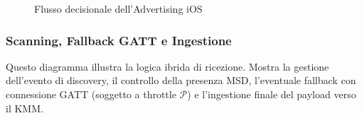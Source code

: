 \documentclass[a4paper,11pt,table,dvipsnames]{article}
\begin{document}
\begin{figure}[H]
    \caption{Flusso decisionale dell'Advertising iOS}
    \label{fig:ios_advertising_flow}
\end{figure}

\newpage

\subsubsection{Scanning, Fallback GATT e Ingestione}
Questo diagramma illustra la logica ibrida di ricezione. Mostra la gestione dell'evento di discovery, il controllo della presenza MSD, l'eventuale fallback con connessione GATT (soggetto a throttle \(\mathcal{P}\)) e l'ingestione finale del payload verso il KMM.
\end{document}
